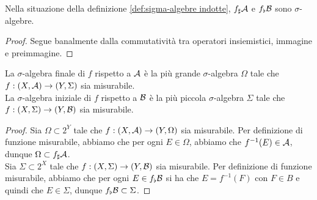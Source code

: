 \documentclass{article}
\renewcommand\A{\mc{A}}
\begin{document}
\begin{proposition}{}{}
    Nella situazione della definizione \ref{def:sigma-algebre indotte}, $f_\sharp\A$ e $f_\flat\mathcal{B}$ sono $\sigma$-algebre.
    \begin{proof}
        Segue banalmente dalla commutatività tra operatori insiemistici, immagine e preimmagine.
    \end{proof}
\end{proposition}

\begin{remark}{}{}
    La $\sigma$-algebra finale di $f$ rispetto a $\A$ è la più grande $\sigma$-algebra $\Omega$ tale che $f : (X,\A)\to (Y,\Sigma)$ sia misurabile.\\
    La $\sigma$-algebra iniziale di $f$ rispetto a $\mathcal{B}$ è la più piccola $\sigma$-algebra $\Sigma$ tale che $f : (X,\Sigma)\to (Y,\mathcal{B})$ sia misurabile.
    \begin{proof}
        Sia $\Omega \subset 2^Y$ tale che $f : (X,\A)\to (Y,\Omega)$ sia misurabile. Per definizione di funzione misurabile, abbiamo che per ogni $E \in \Omega$, abbiamo che $f^{-1}(E)\in \A$, dunque $\Omega\subset f_\sharp\A$.\\
        Sia $\Sigma \subset 2^X$ tale che $f : (X,\Sigma)\to (Y,\mathcal{B})$ sia misurabile. Per definizione di funzione misurabile, abbiamo che per ogni $E \in f_\flat\mathcal{B}$ si ha che $E = f^{-1}(F)$ con $F \in B$ e quindi che $E \in \Sigma$, dunque $f_\flat\mathcal{B}\subset \Sigma$.
    \end{proof}
\end{remark}
\end{document}
